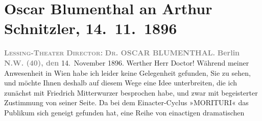 

         
         \renewcommand{\erwaehntePersonen}{Personen: Oskar Blumenthal, Friedrich Mitterwurzer}
         \renewcommand{\erwaehnteInstitutionen}{Institutionen: Lessing-Theater}
         \renewcommand{\erwaehnteOrte}{Orte: Berlin, Wien}
         \renewcommand{\erwaehnteWerke}{Werke: Abschiedssouper, Anatol, Die Frage an das Schicksal, Episode, Morituri, Weihnachts-Einkäufe}
               \section[Oscar Blumenthal an Arthur Schnitzler, 14. 11. 1896]{ Oscar Blumenthal an Arthur Schnitzler, 14. 11. 1896}\nopagebreak{}\rehead{ }\begin{ledgroupsized}[t]{13cm}\normalsize\beginnumbering \toendnotes[C]{\smallbreak\pagebreak[2]} 
\pstart
           \noindent{}\centering{}{\pb}\textcolor{gray}{\textbf{\textsc{Lessing-Theater}}}\pend
           \pstart
           \noindent{}\centering{}\textcolor{gray}{\textbf{\textsc{Director}:}}{ }\textcolor{gray}{\textbf{\textsc{Dr.}{ }OSCAR BLUMENTHAL.}}\pend
           \pstart
           \raggedleft{}\textcolor{gray}{\textbf{Berlin N.W. (40), den}}{ }14. November 1896.\pend
           \pstart\center{}Werther Herr Doctor!\pend\pstart
           Während meiner Anwesenheit in Wien habe ich leider
               keine Gelegenheit gefunden, Sie zu sehen, und möchte Ihnen deshalb auf diesem Wege
               eine Idee unterbreiten, die ich zunächst mit Friedrich Mitterwurzer besprochen habe, und zwar mit begeisterter Zustimmung
               von seiner Seite. Da bei dem Einacter-Cyclus »MORITURI« das Publikum sich geneigt gefunden hat, eine Reihe von einactigen dramatischen

\end{ledgroupsized}
